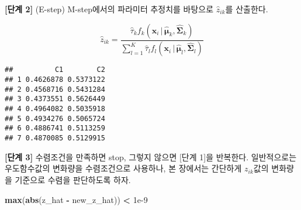 \documentclass[]{book}
\newenvironment{Shaded}{\begin{snugshade}}{\end{snugshade}}
\newcommand{\ControlFlowTok}[1]{\textcolor[rgb]{0.13,0.29,0.53}{\textbf{#1}}}
\newcommand{\DataTypeTok}[1]{\textcolor[rgb]{0.13,0.29,0.53}{#1}}
\newcommand{\DecValTok}[1]{\textcolor[rgb]{0.00,0.00,0.81}{#1}}
\newcommand{\FloatTok}[1]{\textcolor[rgb]{0.00,0.00,0.81}{#1}}
\newcommand{\KeywordTok}[1]{\textcolor[rgb]{0.13,0.29,0.53}{\textbf{#1}}}
\newcommand{\NormalTok}[1]{#1}
\newcommand{\OperatorTok}[1]{\textcolor[rgb]{0.81,0.36,0.00}{\textbf{#1}}}
\newcommand{\StringTok}[1]{\textcolor[rgb]{0.31,0.60,0.02}{#1}}
\begin{document}
\textbf{{[}단계 2{]}} (E-step) M-step에서의 파라미터 추정치를 바탕으로 \(\hat{z}_{ik}\)를 산출한다.

\begin{equation*}
\hat{z}_{ik} = \frac{\hat{\tau}_k f_k(\mathbf{x}_i \, | \, \hat{\boldsymbol{\mu}}_k, \hat{\boldsymbol{\Sigma}}_k)}{\sum_{l = 1}^{K} \hat{\tau}_l f_l(\mathbf{x}_i \, | \, \hat{\boldsymbol{\mu}}_l, \hat{\boldsymbol{\Sigma}}_l)}
\end{equation*}

\begin{Shaded}
\end{Shaded}

\begin{verbatim}
##          C1        C2
## 1 0.4626878 0.5373122
## 2 0.4568716 0.5431284
## 3 0.4373551 0.5626449
## 4 0.4964082 0.5035918
## 5 0.4934276 0.5065724
## 6 0.4886741 0.5113259
## 7 0.4870085 0.5129915
\end{verbatim}

\textbf{{[}단계 3{]}} 수렴조건을 만족하면 stop, 그렇지 않으면 {[}단계 1{]}을 반복한다. 일반적으로는 우도함수값의 변화량을 수렴조건으로 사용하나, 본 장에서는 간단하게 \(z_{ik}\)값의 변화량을 기준으로 수렴을 판단하도록 하자.

\begin{Shaded}
\begin{Highlighting}[]
\KeywordTok{max}\NormalTok{(}\KeywordTok{abs}\NormalTok{(z_hat }\OperatorTok{-}\StringTok{ }\NormalTok{new_z_hat)) }\OperatorTok{<}\StringTok{ }\FloatTok{1e-9}
\end{Highlighting}
\end{Shaded}
\end{document}
